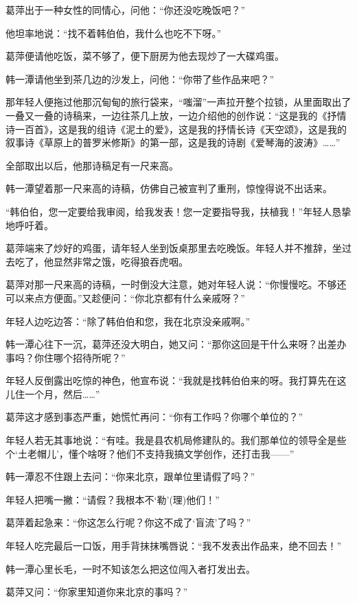 \par 葛萍出于一种女性的同情心，问他：“你还没吃晚饭吧？”
\par 他坦率地说：“找不着韩伯伯，我什么也吃不下呀。”
\par 葛萍便请他吃饭，菜不够了，便下厨房为他去现炒了一大碟鸡蛋。
\par 韩一潭请他坐到茶几边的沙发上，问他：“你带了些作品来吧？”
\par 那年轻人便拖过他那沉甸甸的旅行袋来，“嗤溜”一声拉开整个拉锁，从里面取出了一叠又一叠的诗稿来，一边往茶几上放，一边介绍他的创作说：“这是我的《抒情诗一百首》，这是我的组诗《泥土的爱》，这是我的抒情长诗《天空颂》，这是我的叙事诗《草原上的普罗米修斯》的第一部，这是我的诗剧《爱琴海的波涛》……”
\par 全部取出以后，他那诗稿足有一尺来高。
\par 韩一潭望着那一尺来高的诗稿，仿佛自己被宣判了重刑，惊惶得说不出话来。
\par “韩伯伯，您一定要给我审阅，给我发表！您一定要指导我，扶植我！”年轻人恳挚地呼吁着。
\par 葛萍端来了炒好的鸡蛋，请年轻人坐到饭桌那里去吃晚饭。年轻人并不推辞，坐过去吃了，他显然非常之饿，吃得狼吞虎咽。
\par 葛萍对那一尺来高的诗稿，一时倒没大注意，她对年轻人说：“你慢慢吃。不够还可以来点方便面。”又趁便问：“你北京都有什么亲戚呀？”
\par 年轻人边吃边答：“除了韩伯伯和您，我在北京没亲戚啊。”
\par 韩一潭心往下一沉，葛萍还没大明白，她又问：“那你这回是干什么来呀？出差办事吗？你住哪个招待所呢？”
\par 年轻人反倒露出吃惊的神色，他宣布说：“我就是找韩伯伯来的呀。我打算先在这儿住一个月，然后……”
\par 葛萍这才感到事态严重，她慌忙再问：“你有工作吗？你哪个单位的？”
\par 年轻人若无其事地说：“有哇。我是县农机局修建队的。我们那单位的领导全是些个‘土老帽儿’，懂个啥呀？他们不支持我搞文学创作，还打击我——”
\par 韩一潭忍不住跟上去问：“你来北京，跟单位里请假了吗？”
\par 年轻人把嘴一撇：“请假？我根本不‘勒’(理)他们！”
\par 葛萍着起急来：“你这怎么行呢？你这不成了‘盲流’了吗？”
\par 年轻人吃完最后一口饭，用手背抹抹嘴唇说：“我不发表出作品来，绝不回去！”
\par 韩一潭心里长毛，一时不知该怎么把这位闯入者打发出去。
\par 葛萍又问：“你家里知道你来北京的事吗？”
